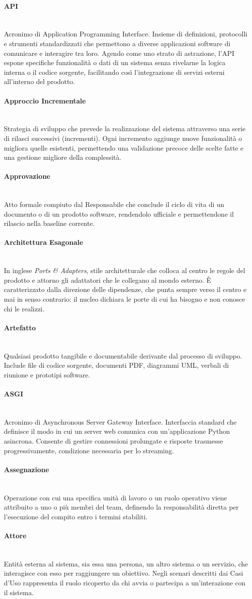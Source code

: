 \documentclass[a4paper, 10pt, colorlinks=true, linkcolor=black, urlcolor=blue, citecolor=blue, hidelinks]{article}
\newcommand{\glossaryterm}[2]{
    \paragraph{#1 \label{term:#1}} \mbox{} \\
    #2
    \vspace{0.5em}
}
\begin{document}
\glossaryterm{API}{Acronimo di Application Programming Interface. Insieme di definizioni, protocolli e strumenti standardizzati che permettono a diverse applicazioni software di comunicare e interagire tra loro. Agendo come uno strato di astrazione, l'API espone specifiche funzionalità o dati di un sistema senza rivelarne la logica interna o il codice sorgente, facilitando così l'integrazione di servizi esterni all'interno del prodotto.}

\glossaryterm{Approccio Incrementale}{Strategia di sviluppo che prevede la realizzazione del sistema attraverso una serie di rilasci successivi (incrementi). Ogni incremento aggiunge nuove funzionalità o migliora quelle esistenti, permettendo una validazione precoce delle scelte fatte e una gestione migliore della complessità.}

\glossaryterm{Approvazione}{Atto formale compiuto dal Responsabile che conclude il ciclo di vita di un documento o di un prodotto software, rendendolo ufficiale e permettendone il rilascio nella baseline corrente.}

\glossaryterm{Architettura Esagonale}{In inglese \textit{Ports \& Adapters}, stile architetturale che colloca al centro le regole del prodotto e attorno gli adattatori che le collegano al mondo esterno. È caratterizzato dalla direzione delle dipendenze, che punta sempre verso il centro e mai in senso contrario: il nucleo dichiara le porte di cui ha bisogno e non conosce chi le realizzi.}

\glossaryterm{Artefatto}{Qualsiasi prodotto tangibile e documentabile derivante dal processo di sviluppo. Include file di codice sorgente, documenti PDF, diagrammi UML, verbali di riunione e prototipi software.}

\glossaryterm{ASGI}{Acronimo di Asynchronous Server Gateway Interface. Interfaccia standard che definisce il modo in cui un server web comunica con un'applicazione Python asincrona. Consente di gestire connessioni prolungate e risposte trasmesse progressivamente, condizione necessaria per lo streaming.}

\glossaryterm{Assegnazione}{Operazione con cui una specifica unità di lavoro o un ruolo operativo viene attribuito a uno o più membri del team, definendo la responsabilità diretta per l'esecuzione del compito entro i termini stabiliti.}

\glossaryterm{Attore}{Entità esterna al sistema, sia essa una persona, un altro sistema o un servizio, che interagisce con esso per raggiungere un obiettivo. Negli scenari descritti dai Casi d'Uso rappresenta il ruolo ricoperto da chi avvia o partecipa a un'interazione con il sistema.}
\end{document}
